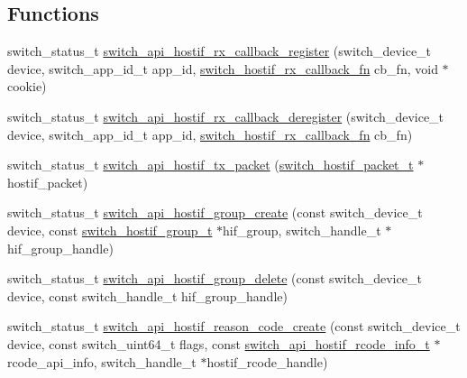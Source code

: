 \subsection*{Functions}
\begin{DoxyCompactItemize}
\item 
switch\+\_\+status\+\_\+t \hyperlink{group__HostInterface_ga83fd4080c1b537079798860daefbf6cc}{switch\+\_\+api\+\_\+hostif\+\_\+rx\+\_\+callback\+\_\+register} (switch\+\_\+device\+\_\+t device, switch\+\_\+app\+\_\+id\+\_\+t app\+\_\+id, \hyperlink{group__HostInterface_gaeb0d6cedcbaf8794cc964f72383bc404}{switch\+\_\+hostif\+\_\+rx\+\_\+callback\+\_\+fn} cb\+\_\+fn, void $\ast$cookie)
\item 
switch\+\_\+status\+\_\+t \hyperlink{group__HostInterface_ga31fe407c40876daea5a30bafb648e0a7}{switch\+\_\+api\+\_\+hostif\+\_\+rx\+\_\+callback\+\_\+deregister} (switch\+\_\+device\+\_\+t device, switch\+\_\+app\+\_\+id\+\_\+t app\+\_\+id, \hyperlink{group__HostInterface_gaeb0d6cedcbaf8794cc964f72383bc404}{switch\+\_\+hostif\+\_\+rx\+\_\+callback\+\_\+fn} cb\+\_\+fn)
\item 
switch\+\_\+status\+\_\+t \hyperlink{group__HostInterface_ga17e21f6a908c5b9b4ed994e8aba767d5}{switch\+\_\+api\+\_\+hostif\+\_\+tx\+\_\+packet} (\hyperlink{group__HostInterface_gacf3b5146e7fbf5d3726cbd9ba7cd6636}{switch\+\_\+hostif\+\_\+packet\+\_\+t} $\ast$hostif\+\_\+packet)
\item 
switch\+\_\+status\+\_\+t \hyperlink{group__HostInterface_ga9e9ddcf1e547c133df0c8ece60982f49}{switch\+\_\+api\+\_\+hostif\+\_\+group\+\_\+create} (const switch\+\_\+device\+\_\+t device, const \hyperlink{group__HostInterface_gaaacd1815b505c965d68a7604f211d907}{switch\+\_\+hostif\+\_\+group\+\_\+t} $\ast$hif\+\_\+group, switch\+\_\+handle\+\_\+t $\ast$hif\+\_\+group\+\_\+handle)
\item 
switch\+\_\+status\+\_\+t \hyperlink{group__HostInterface_ga07f00ae4bc53e60002ebad9c7ee297a8}{switch\+\_\+api\+\_\+hostif\+\_\+group\+\_\+delete} (const switch\+\_\+device\+\_\+t device, const switch\+\_\+handle\+\_\+t hif\+\_\+group\+\_\+handle)
\item 
switch\+\_\+status\+\_\+t \hyperlink{group__HostInterface_ga6ce501a10c9d4d167aaa71f35f0f3c65}{switch\+\_\+api\+\_\+hostif\+\_\+reason\+\_\+code\+\_\+create} (const switch\+\_\+device\+\_\+t device, const switch\+\_\+uint64\+\_\+t flags, const \hyperlink{group__HostInterface_gad572618a94aec43492d76730093e105f}{switch\+\_\+api\+\_\+hostif\+\_\+rcode\+\_\+info\+\_\+t} $\ast$rcode\+\_\+api\+\_\+info, switch\+\_\+handle\+\_\+t $\ast$hostif\+\_\+rcode\+\_\+handle)

\end{DoxyCompactItemize}
